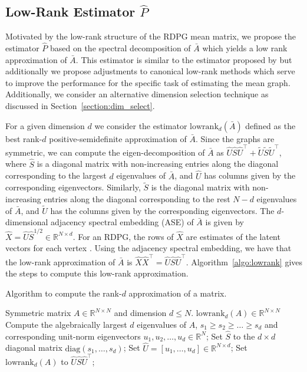 \documentclass[10pt,letterpaper]{article}
\renewcommand{\Re}{\mathbb{R}}
\renewcommand{\hat}{\widehat}
\begin{document}
\subsection[Low-Rank Estimator]{Low-Rank Estimator $\hat{P}$}
\label{sec:phat}

Motivated by the low-rank structure of the RDPG mean matrix, we propose the estimator $\hat{P}$ based on the spectral decomposition of $\bar{A}$ which yields a low rank approximation of $\bar{A}$.
This estimator is similar to the estimator proposed by \citet{chatterjee2015matrix} but additionally
we propose adjustments to canonical low-rank methods which serve to improve the performance for the specific task of estimating the mean graph. 
Additionally, we consider an alternative dimension selection technique as discussed in Section~\ref{section:dim_select}.

For a given dimension $d$ we consider the estimator $\mathrm{lowrank}_d(\bar{A})$ defined as the best rank-$d$ positive-semidefinite approximation of $\bar{A}$.
Since the graphs are symmetric, we can compute the eigen-decomposition of $\bar{A}$ as $\hat{U} \hat{S} \hat{U}^{\top} + \tilde{U}\tilde{S}\tilde{U}^{\top}$, where $\hat{S}$ is a diagonal matrix with non-increasing entries along the diagonal corresponding to the largest $d$ eigenvalues of $\bar{A}$, and $\hat{U}$ has columns given by the corresponding eigenvectors. Similarly, $\tilde{S}$ is the diagonal matrix with non-increasing entries along the diagonal corresponding to the rest $N - d$ eigenvalues of $\bar{A}$, and $\tilde{U}$ has the columns given by the corresponding eigenvectors.
The $d$-dimensional adjacency spectral embedding (ASE) of $\bar{A}$ is given by $\hat{X}=\hat{U} \hat{S}^{1/2}\in \Re^{N \times d}$.
For an RDPG, the rows of $\hat{X}$ are estimates of the latent vectors for each vertex \citep{sussman2014consistent}.
Using the adjacency spectral embedding, we have that the low-rank approximation of $\bar{A}$ is $\hat{X} \hat{X}^{\top}=\hat{U}\hat{S}\hat{U}^{\top}$.
Algorithm~\ref{algo:lowrank} gives the steps to compute this low-rank approximation.

\begin{algorithm}[H]
\caption{Algorithm to compute the rank-$d$ approximation of a matrix.}
\label{algo:lowrank}
\begin{algorithmic}[1]
\REQUIRE Symmetric matrix $A\in \Re^{N\times N}$ and dimension $d\leq N$.
\ENSURE $\mathrm{lowrank}_d(A)\in \Re^{N\times N}$
\STATE Compute the algebraically largest $d$ eigenvalues of $A$, $s_1\geq s_2\geq \dotsc\geq s_d$ and corresponding unit-norm eigenvectors $u_1,u_2,\dotsc,u_d\in \Re^N$;
\STATE Set $\hat{S}$ to the $d\times d$ diagonal matrix $\mathrm{diag}(s_1,\dotsc,s_d)$;
\STATE Set $\hat{U} = [u_1,\dotsc,u_d]\in \Re^{N\times d}$;
\STATE Set $\mathrm{lowrank}_d(A)$ to $\hat{U}\hat{S}\hat{U}^{\top}$;
\end{algorithmic}
\end{algorithm}
\end{document}
